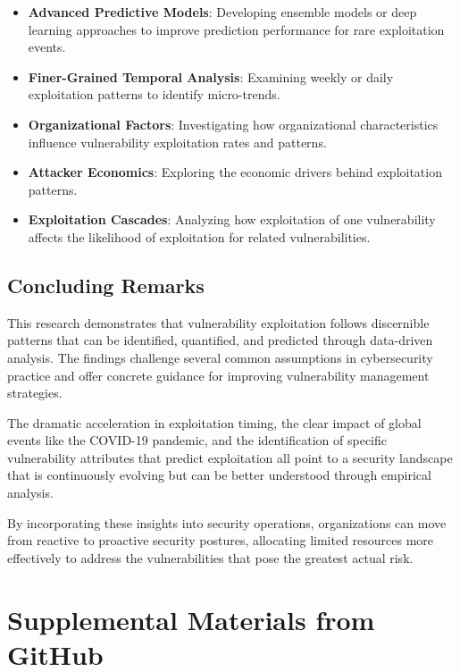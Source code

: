\documentclass[runningheads]{llncs}
\begin{document}
\begin{itemize}
    \item \textbf{Advanced Predictive Models}: Developing ensemble models or deep learning approaches to improve prediction performance for rare exploitation events.
    
    \item \textbf{Finer-Grained Temporal Analysis}: Examining weekly or daily exploitation patterns to identify micro-trends.
    
    \item \textbf{Organizational Factors}: Investigating how organizational characteristics influence vulnerability exploitation rates and patterns.
    
    \item \textbf{Attacker Economics}: Exploring the economic drivers behind exploitation patterns.
    
    \item \textbf{Exploitation Cascades}: Analyzing how exploitation of one vulnerability affects the likelihood of exploitation for related vulnerabilities.
\end{itemize}

\subsection{Concluding Remarks}
This research demonstrates that vulnerability exploitation follows discernible patterns that can be identified, quantified, and predicted through data-driven analysis. The findings challenge several common assumptions in cybersecurity practice and offer concrete guidance for improving vulnerability management strategies.

The dramatic acceleration in exploitation timing, the clear impact of global events like the COVID-19 pandemic, and the identification of specific vulnerability attributes that predict exploitation all point to a security landscape that is continuously evolving but can be better understood through empirical analysis.

By incorporating these insights into security operations, organizations can move from reactive to proactive security postures, allocating limited resources more effectively to address the vulnerabilities that pose the greatest actual risk.

\section{Supplemental Materials from GitHub}
\label{sec:supplemental_materials}
\end{document}
